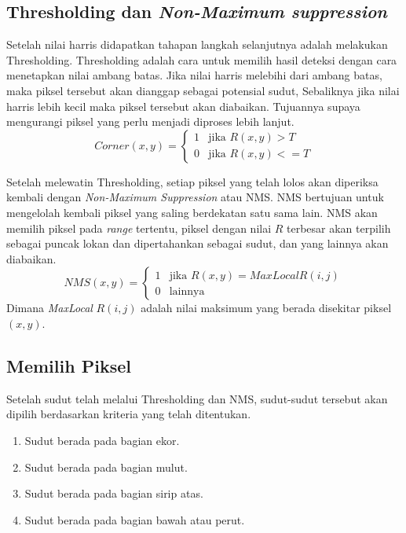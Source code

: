 \subsection{\textbf{Thresholding dan \emph{Non-Maximum suppression}}}
    Setelah nilai harris didapatkan tahapan langkah selanjutnya adalah melakukan Thresholding.
Thresholding adalah cara untuk memilih hasil deteksi dengan cara menetapkan nilai ambang batas.
Jika nilai harris melebihi dari ambang batas, maka piksel tersebut akan dianggap sebagai potensial sudut, Sebaliknya jika nilai harris lebih kecil maka piksel tersebut akan diabaikan.
Tujuannya supaya mengurangi piksel yang perlu menjadi diproses lebih lanjut. 
\begin{equation}
    Corner(x,y) = 
    \begin{cases}  
        1 & \text{jika } R(x,y) > T \\ 
        0 & \text{jika } R(x,y) <= T
    \end{cases}
\end{equation}

    Setelah melewatin Thresholding, setiap piksel yang telah lolos akan diperiksa kembali dengan \emph{Non-Maximum Suppression} atau NMS.
NMS bertujuan untuk mengelolah kembali piksel yang saling berdekatan satu sama lain. NMS akan memilih piksel pada \emph{range} tertentu, piksel dengan nilai \(R\) terbesar akan terpilih sebagai puncak lokan dan dipertahankan sebagai sudut, dan yang lainnya akan diabaikan.
\begin{equation*}
    NMS(x,y) =
    \begin{cases}
        1 & \text{jika } R(x,y) = MaxLocal R(i,j) \\
        0 & \text{lainnya }
    \end{cases}
\end{equation*}
Dimana \emph{MaxLocal} \(R(i,j)\) adalah nilai maksimum yang berada disekitar piksel \((x,y)\).

\subsection{\textbf{Memilih Piksel}}
    Setelah sudut telah melalui Thresholding dan NMS, sudut-sudut tersebut akan dipilih berdasarkan kriteria yang telah ditentukan.
\begin{enumerate}
    \item Sudut berada pada bagian ekor.
    \item Sudut berada pada bagian mulut.
    \item Sudut berada pada bagian sirip atas.
    \item Sudut berada pada bagian bawah atau perut.
\end{enumerate}

